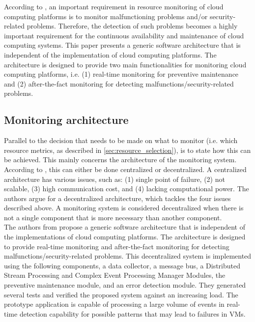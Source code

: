 \noindent
According to \cite{aktas2018hybrid}, an important requirement in resource monitoring of cloud computing platforms is to monitor malfunctioning problems and/or security-related problems. Therefore, the detection of such problems becomes a highly important requirement for the continuous availability and maintenance of cloud computing systems. This paper presents a generic software architecture that is independent of the implementation of cloud computing platforms. The architecture is designed to provide two main functionalities for monitoring cloud computing platforms, i.e. (1) real-time monitoring for preventive maintenance and (2) after-the-fact monitoring for detecting malfunctions/security-related problems.\\

\subsection{Monitoring architecture} \label{sec:monitoring_architecture}
Parallel to the decision that needs to be made on what to monitor (i.e. which resource metrics, as described in \autoref{sec:resource_selection}), is to state how this can be achieved. This mainly concerns the architecture of the monitoring system. According to \cite{kumar2017inspection}, this can either be done centralized or decentralized. A centralized architecture has various issues, such as: (1) single point of failure, (2) not scalable, (3) high communication cost, and (4) lacking computational power. The authors argue for a decentralized architecture, which tackles the four issues described above. A monitoring system is considered decentralized when there is not a single component that is more necessary than another component.\\

\noindent
The authors from \cite{aktas2018hybrid} propose a generic software architecture that is independent of the implementations of cloud computing platforms. The architecture is designed to provide real-time monitoring and after-the-fact monitoring for detecting malfunctions/security-related problems. This decentralized system is implemented using the following components, a data collector, a message bus, a Distributed Stream Processing and Complex Event Processing Manager Modules, the preventive maintenance module, and an error detection module. They generated several tests and verified the proposed system against an increasing load. The prototype application is capable of processing a large volume of events in real-time detection capability for possible patterns that may lead to failures in VMs.\\

